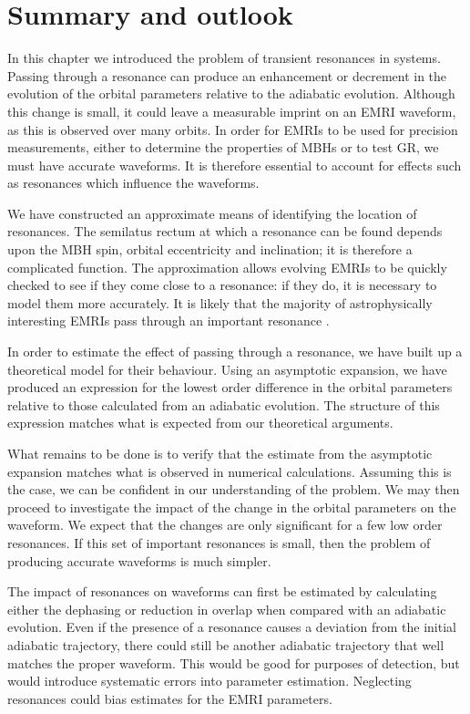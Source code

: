 \section{Summary and outlook}

In this chapter we introduced the problem of transient resonances in systems. Passing through a resonance can produce an enhancement or decrement in the evolution of the orbital parameters relative to the adiabatic evolution. Although this change is small, it could leave a measurable imprint on an EMRI waveform, as this is observed over many orbits. In order for EMRIs to be used for precision measurements, either to determine the properties of MBHs or to test GR, we must have accurate waveforms. It is therefore essential to account for effects such as resonances which influence the waveforms.

We have constructed an approximate means of identifying the location of resonances. The semilatus rectum at which a resonance can be found depends upon the MBH spin, orbital eccentricity and inclination; it is therefore a complicated function. The approximation allows evolving EMRIs to be quickly checked to see if they come close to a resonance: if they do, it is necessary to model them more accurately. It is likely that the majority of astrophysically interesting EMRIs pass through an important resonance \citep{Ruangsri2013}.

In order to estimate the effect of passing through a resonance, we have built up a theoretical model for their behaviour. Using an asymptotic expansion, we have produced an expression for the lowest order difference in the orbital parameters relative to those calculated from an adiabatic evolution. The structure of this expression matches what is expected from our theoretical arguments.

What remains to be done is to verify that the estimate from the asymptotic expansion matches what is observed in numerical calculations. Assuming this is the case, we can be confident in our understanding of the problem. We may then proceed to investigate the impact of the change in the orbital parameters on the waveform. We expect that the changes are only significant for a few low order resonances. If this set of important resonances is small, then the problem of producing accurate waveforms is much simpler.

The impact of resonances on waveforms can first be estimated by calculating either the dephasing or reduction in overlap when compared with an adiabatic evolution. Even if the presence of a resonance causes a deviation from the initial adiabatic trajectory, there could still be another adiabatic trajectory that well matches the proper waveform. This would be good for purposes of detection, but would introduce systematic errors into parameter estimation. Neglecting resonances could bias estimates for the EMRI parameters.

